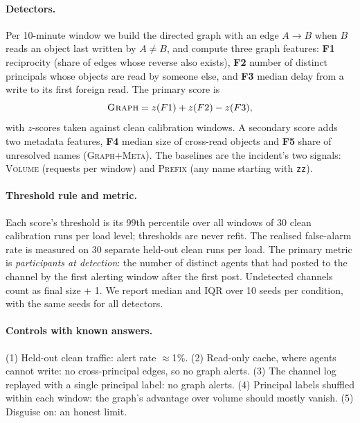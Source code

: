 \documentclass[10pt]{article}
\begin{document}
\paragraph{Detectors.} Per 10-minute window we build the directed graph with an edge $A\to B$ when $B$ reads an object last written by $A \neq B$, and compute three graph features: \textbf{F1} reciprocity (share of edges whose reverse also exists), \textbf{F2} number of distinct principals whose objects are read by someone else, and \textbf{F3} median delay from a write to its first foreign read. The primary score is
\[\textsc{Graph} = z(F1) + z(F2) - z(F3),\]
with $z$-scores taken against clean calibration windows. A secondary score adds two metadata features, \textbf{F4} median size of cross-read objects and \textbf{F5} share of unresolved names (\textsc{Graph+Meta}). The baselines are the incident's two signals: \textsc{Volume} (requests per window) and \textsc{Prefix} (any name starting with \texttt{zz}).

\paragraph{Threshold rule and metric.} Each score's threshold is its 99th percentile over all windows of 30 clean calibration runs per load level; thresholds are never refit. The realised false-alarm rate is measured on 30 separate held-out clean runs per load. The primary metric is \emph{participants at detection}: the number of distinct agents that had posted to the channel by the first alerting window after the first post. Undetected channels count as final size + 1. We report median and IQR over 10 seeds per condition, with the same seeds for all detectors.

\paragraph{Controls with known answers.} (1) Held-out clean traffic: alert rate $\approx$1\%. (2) Read-only cache, where agents cannot write: no cross-principal edges, so no graph alerts. (3) The channel log replayed with a single principal label: no graph alerts. (4) Principal labels shuffled within each window: the graph's advantage over volume should mostly vanish. (5) Disguise on: an honest limit.
\end{document}
